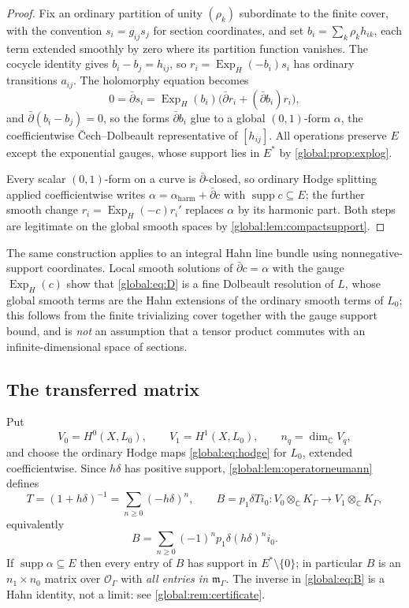 \documentclass[11pt,letterpaper]{article}
\theoremstyle{definition}
\theoremstyle{remark}
\newcommand{\C}{\mathbb C}
\newcommand{\OO}{\mathcal O}
\newcommand{\KK}{K_\Gamma}
\newcommand{\mK}{\mathfrak m_\Gamma}
\newcommand{\supp}{\operatorname{supp}}
\newcommand{\ExpH}{\operatorname{Exp}_{H}}
\numberwithin{equation}{section}
\begin{document}
\begin{proof}
Fix an ordinary partition of unity $(\rho_k)$ subordinate to the finite cover, with the convention $s_i=g_{ij}s_j$ for section coordinates, and set $b_i=\sum_k\rho_kh_{ik}$, each term extended smoothly by zero where its partition function vanishes. The cocycle identity gives $b_i-b_j=h_{ij}$, so $r_i=\ExpH(-b_i)s_i$ has ordinary transitions $a_{ij}$. The holomorphy equation becomes
\[
  0=\bar\partial s_i=\ExpH(b_i)\bigl(\bar\partial r_i+(\bar\partial b_i)r_i\bigr),
\]
and $\bar\partial(b_i-b_j)=0$, so the forms $\bar\partial b_i$ glue to a global $(0,1)$-form $\alpha$, the coefficientwise \v Cech--Dolbeault representative of $[h_{ij}]$. All operations preserve $E$ except the exponential gauges, whose support lies in $E^*$ by \cref{global:prop:explog}.

Every scalar $(0,1)$-form on a curve is $\bar\partial$-closed, so ordinary Hodge splitting applied coefficientwise writes $\alpha=\alpha_{\mathrm{harm}}+\bar\partial c$ with $\supp c\subseteq E$; the further smooth change $r_i=\ExpH(-c)r_i'$ replaces $\alpha$ by its harmonic part. Both steps are legitimate on the global smooth spaces by \cref{global:lem:compactsupport}.
\end{proof}

The same construction applies to an integral Hahn line bundle using nonnegative-support coordinates. Local smooth solutions of $\bar\partial c=\alpha$ with the gauge $\ExpH(c)$ show that \eqref{global:eq:D} is a fine Dolbeault resolution of $L$, whose global smooth terms are the Hahn extensions of the ordinary smooth terms of $L_0$; this follows from the finite trivializing cover together with the gauge support bound, and is \emph{not} an assumption that a tensor product commutes with an infinite-dimensional space of sections.

\subsection{The transferred matrix}

Put
\[
  V_0=H^0(X,L_0),\qquad V_1=H^1(X,L_0),\qquad n_q=\dim_\C V_q,
\]
and choose the ordinary Hodge maps \eqref{global:eq:hodge} for $L_0$, extended coefficientwise. Since $h\delta$ has positive support, \cref{global:lem:operatorneumann} defines
\begin{equation}\label{global:eq:B}
  T=(1+h\delta)^{-1}=\sum_{n\ge0}(-h\delta)^n,
  \qquad
  B=p_1\delta Ti_0:V_0\otimes_\C\KK\longrightarrow V_1\otimes_\C\KK,
\end{equation}
equivalently
\begin{equation}\label{global:eq:Bexpanded}
  B=\sum_{n\ge0}(-1)^np_1\delta(h\delta)^ni_0 .
\end{equation}
If $\supp\alpha\subseteq E$ then every entry of $B$ has support in $E^*\setminus\{0\}$; in particular $B$ is an $n_1\times n_0$ matrix over $\OO_\Gamma$ with \emph{all entries in $\mK$}. The inverse in \eqref{global:eq:B} is a Hahn identity, not a limit: see \cref{global:rem:certificate}.
\end{document}
